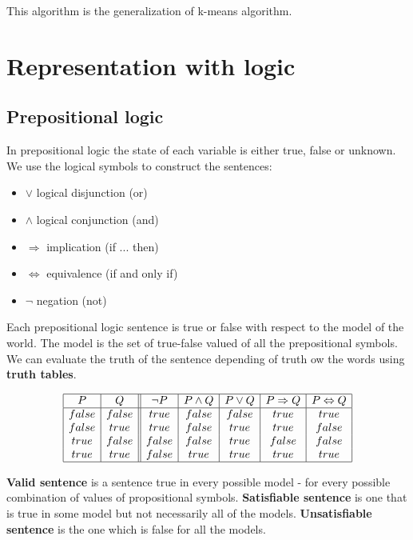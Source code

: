 \documentclass[a4paper,10pt]{article}
\begin{document}
This algorithm is the generalization of k-means algorithm.


\section{Representation with logic}

\subsection{Prepositional logic}	

In prepositional logic the state of each variable is either true, false or unknown. 
We use the logical symbols to construct the sentences:
\begin{itemize}
\setlength{\itemsep}{0pt}
\setlength{\parskip}{0pt}
\setlength{\parsep}{0pt}
\item $\vee$ logical disjunction (or)
\item $\wedge$ logical conjunction (and)
\item $\Rightarrow$ implication (if ... then)
\item $\Leftrightarrow$ equivalence (if and only if)
\item $\lnot$ negation (not)
\end{itemize}
Each prepositional logic sentence is true or false with respect to the model of the world. The model is the set of true-false valued of all the prepositional symbols. We can evaluate the truth of the sentence depending of truth ow the words using \textbf{truth tables}.

\begin{displaymath}
\begin{array}{|c|c||c|c|c|c|c|}
\hline
   P & Q & \lnot{}P & P\land{}Q & P\lor{}Q & P\Rightarrow{}Q & P\Leftrightarrow{}Q \\
\hline
false & false & true & false & false & true & true \\
false & true & true & false & true & true & false \\
true & false & false & false & true & false & false \\
true & true & false & true & true & true & true \\
\hline
\end{array}
\end{displaymath}

\textbf{Valid sentence} is a sentence true in every possible model - for every possible combination of values of propositional symbols. \textbf{Satisfiable sentence} is one that is true in some model but not necessarily all of the models. \textbf{Unsatisfiable sentence} is the one which is false for all the models.
\end{document}
